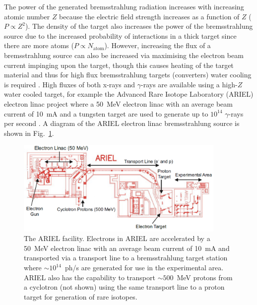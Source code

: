 \documentclass[../main.tex]{subfiles}
\begin{document}
The power of the generated bremsstrahlung radiation increases with increasing atomic number $Z$ because the electric field strength increases as a function of $Z$ ($P \propto Z^{2}$). The density of the target also increases the power of the bremsstrahlung source due to the increased probability of interactions in a thick target since there are more atoms ($P \propto N_{\mathrm{atom}}$). However, increasing the flux of a bremsstrahlung source can also be increased via maximising the electron beam current impinging upon the target, though this causes heating of the target material and thus for high flux bremsstrahlung targets (converters) water cooling is required \cite{auslender2004bremsstrahlung}. High fluxes of both x-rays and $\gamma$-rays are available using a high-$Z$ water cooled target, for example the Advanced Rare Isotope Laboratory (ARIEL) electron linac project \cite{dilling2013ariel} where a 50~\si{\mega\electronvolt} electron linac with an average beam current of 10~\si{\milli\ampere} and a tungsten target are used to generate up to $10^{14}$ $\gamma$-rays per second \cite{lebois2011simulations}. A diagram of the ARIEL electron linac bremsstrahlung source is shown in Fig.~\ref{fig:ARIEL_facility}.
\begin{figure}[!h]
\centering
\includegraphics[width=0.9\textwidth]{Figures/Introduction/ARIEL_facility_fixed.pdf}
\caption{The ARIEL facility. Electrons in ARIEL are accelerated by a 50~\si{\mega\electronvolt} electron linac with an average beam current of 10~\si{\milli\ampere} and transported via a transport line to a bremsstrahlung target station where $\sim 10^{14}$~ph/\si{\second} are generated for use in the experimental area. ARIEL also has the capability to transport $\sim500$~\si{\mega\electronvolt} protons from a cyclotron (not shown) using the same transport line to a proton target for generation of rare isotopes.}
\label{fig:ARIEL_facility}
\end{figure}
\end{document}
